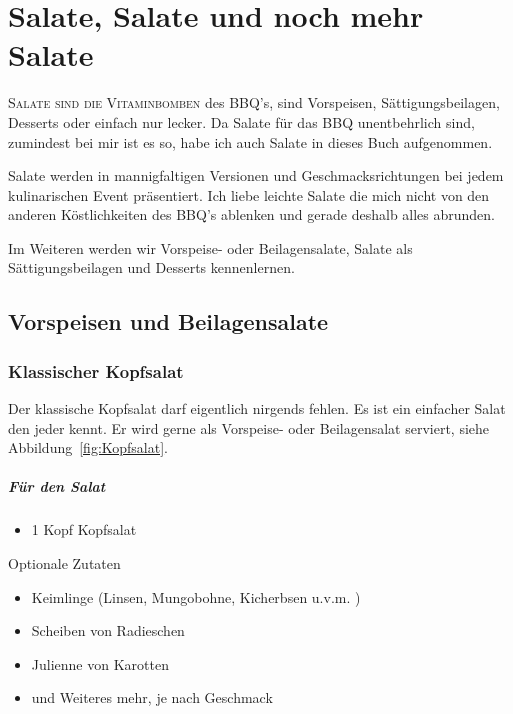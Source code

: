 \chapter{Salate, Salate und noch mehr Salate}\label{Chapter5}
\lettrine[lines=3]{S}{alate sind die Vitaminbomben} des BBQ's, sind  Vorspeisen, Sättigungsbeilagen, Desserts oder einfach nur lecker. Da 
Salate für das BBQ
unentbehrlich sind, zumindest bei mir ist es so, habe ich auch Salate in dieses Buch aufgenommen. 

Salate werden in mannigfaltigen Versionen und Geschmacksrichtungen bei jedem kulinarischen Event präsentiert. Ich liebe leichte Salate 
die mich nicht von
den anderen Köstlichkeiten des BBQ's ablenken und gerade deshalb alles abrunden.

Im Weiteren werden wir Vorspeise- oder Beilagensalate, Salate als Sättigungsbeilagen und Desserts kennenlernen. 

\section{ Vorspeisen und Beilagensalate}

\subsection{Klassischer Kopfsalat}

Der klassische Kopfsalat darf eigentlich nirgends fehlen. Es ist ein einfacher Salat den jeder kennt. Er wird gerne als Vorspeise- oder 
Beilagensalat serviert, siehe Abbildung~\vref{fig:Kopfsalat}. 


\paragraph{Für den Salat}

\begin{itemize}[noitemsep]
	\item 1 Kopf Kopfsalat
\end{itemize}

Optionale Zutaten

\begin{itemize}[noitemsep]
	\item Keimlinge (Linsen, Mungobohne, Kicherbsen u.v.m. )
	\item Scheiben von Radieschen
	\item Julienne von Karotten
	\item und Weiteres mehr, je nach Geschmack
\end{itemize}


